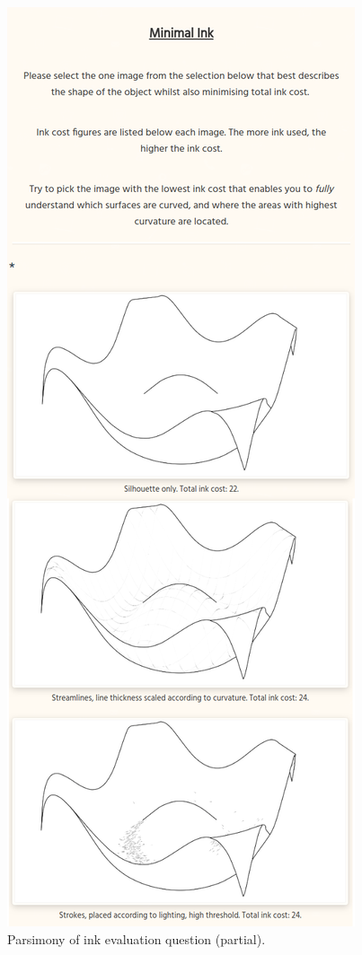 \begin{figure}[h!]
	\centering
	\includegraphics[height=0.8\textheight]{images/eval_ink_1.png}
	\caption{Parsimony of ink evaluation question (partial).}\label{eval_ink_1}
\end{figure}

